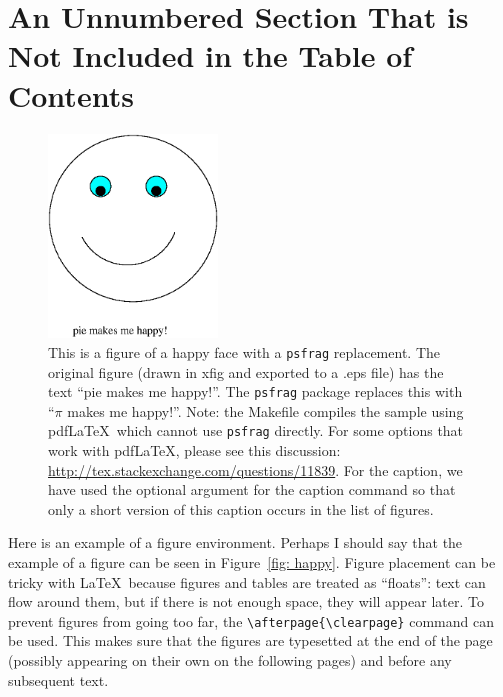 \documentclass[msc,oneside]{ubcthesis}
\begin{document}
\section*{An Unnumbered Section That is Not Included in the Table of
  Contents}
\begin{figure}[ht]
  \begin{center}
    \includegraphics[width=0.4\textwidth]{fig}
    \caption[Happy Face: figure example.]{\label{fig:happy} This is a figure of
      a happy face with a \texttt{psfrag} replacement.  The original figure
      (drawn in xfig and exported to a .eps file) has the text ``pie makes me
      happy!''.  The \texttt{psfrag} package replaces this with ``$\pi$ makes me
      happy!''.  Note: the Makefile compiles the sample using pdf\LaTeX\ which
      cannot use \texttt{psfrag} directly.  For some options that work with
      pdf\LaTeX, please see this discussion:
      \url{http://tex.stackexchange.com/questions/11839}.  For the caption, we
      have used the optional argument for the caption command so that only a
      short version of this caption occurs in the list of figures.}
  \end{center}
\end{figure}
\afterpage{\clearpage}
Here is an example of a figure environment.
Perhaps I should say that the example of a figure can be seen in
Figure~\ref{fig: happy}.  Figure placement can be tricky with \LaTeX\
because figures and tables are treated as ``floats'': text can flow
around them, but if there is not enough space, they will appear later.
To prevent figures from going too far, the
\verb|\afterpage{\clearpage}| command can be used.  This makes sure
that the figures are typesetted at the end of the page (possibly appearing on
their own on the following pages) and before any subsequent text.
\end{document}
